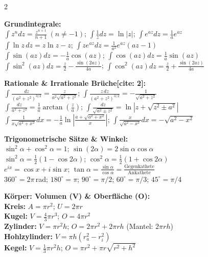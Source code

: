 \documentclass[a4paper, 7.5pt]{extarticle}
\begin{document}
\begin{multicols*}{2}
\begin{tcolorbox}[title={Nützliche Integrale \& Geometrie (Maximalfassung)}]
\textbf{Grundintegrale:}\\
$\int z^n dz = \frac{z^{n+1}}{n+1} \ (n \neq -1)$; \quad $\int \frac{1}{z} dz = \ln|z|$; \quad $\int e^{az} dz = \frac{1}{a}e^{az}$\\[3pt]
$\int \ln z \, dz = z \ln z - z$; \quad $\int z e^{az} dz = \frac{1}{a^2}e^{az}(az-1)$\\[3pt]
$\int \sin(az) dz = -\frac{1}{a}\cos(az)$; \quad $\int \cos(az) dz = \frac{1}{a}\sin(az)$\\[3pt]
$\int \sin^2(az) dz = \frac{z}{2} - \frac{\sin(2az)}{4a}$; \quad $\int \cos^2(az) dz = \frac{z}{2} + \frac{\sin(2az)}{4a}$

\smallskip
\textbf{Rationale \& Irrationale Brüche[cite: 2]:}\\
$\int \frac{dz}{(a^2+z^2)^{3/2}} = \frac{z}{a^2\sqrt{a^2+z^2}}$; \quad $\int \frac{z \, dz}{(a^2+z^2)^{3/2}} = -\frac{1}{\sqrt{a^2+z^2}}$\\[3pt]
$\int \frac{dz}{a^2+z^2} = \frac{1}{a}\arctan(\frac{z}{a})$; \quad $\int \frac{dz}{\sqrt{a^2 \pm z^2}} = \ln|z + \sqrt{z^2 \pm a^2}|$\\[3pt]
$\int \frac{1}{x\sqrt{a^2+x^2}}dx = -\frac{1}{a}\ln|\frac{a+\sqrt{a^2+x^2}}{x}|$; \quad $\int \frac{x}{\sqrt{a^2-x^2}}dx = -\sqrt{a^2-x^2}$

\smallskip
\textbf{Trigonometrische Sätze \& Winkel:}\\
$\sin^2\alpha + \cos^2\alpha = 1$; \quad $\sin(2\alpha) = 2\sin\alpha\cos\alpha$\\[2pt]
$\sin^2\alpha = \frac{1}{2}(1-\cos 2\alpha)$; \quad $\cos^2\alpha = \frac{1}{2}(1+\cos 2\alpha)$\\[2pt]
$e^{ix} = \cos x + i\sin x$; \quad $\tan\alpha = \frac{\sin\alpha}{\cos\alpha} = \frac{\text{Gegenkathete}}{\text{Ankathete}}$\\[2pt]
$360^\circ = 2\pi$\,rad; \quad $180^\circ = \pi$; \quad $90^\circ = \pi/2$; \quad $60^\circ = \pi/3$; \quad $45^\circ = \pi/4$

\smallskip
\textbf{Körper: Volumen (V) \& Oberfläche (O):}\\
\textbf{Kreis:} $A = \pi r^2$; \quad $U = 2\pi r$\\[2pt]
\textbf{Kugel:} $V = \frac{4}{3}\pi r^3$; \quad $O = 4\pi r^2$\\[2pt]
\textbf{Zylinder:} $V = \pi r^2 h$; \quad $O = 2\pi r^2 + 2\pi rh$ (Mantel: $2\pi rh$)\\[2pt]
\textbf{Hohlzylinder:} $V = \pi h (r_a^2 - r_i^2)$\\[2pt]
\textbf{Kegel:} $V = \frac{1}{3}\pi r^2 h$; \quad $O = \pi r^2 + \pi r \sqrt{r^2+h^2}$


\end{tcolorbox}
\end{multicols*}
\end{document}
